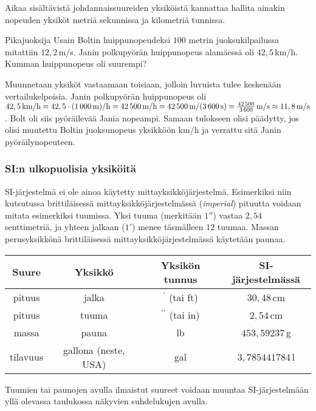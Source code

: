 Aikaa sisältävistä johdannaissuureiden yksiköistä kannattaa hallita ainakin nopeuden yksiköt metriä sekunnissa ja kilometriä tunnissa.

\begin{esimerkki}
Pikajuoksija Usain Boltin huippunopeudeksi $100$ metrin juoksukilpailussa mitattiin $12,2$\,m/s. Janin polkupyörän huippunopeus alamäessä oli $42,5$\,km/h. Kumman huippunopeus oli suurempi?
	\begin{esimratk}
Muunnetaan yksiköt vastaamaan toisiaan, jolloin luvuista tulee keskenään vertailukelpoisia. Janin polkupyörän huippunopeus oli $42,5\,\textrm{km/h} =42,5\cdot \textrm{(1\,000\,m)/h} = 42\,500\,\textrm{m/h} = 42\,500\,\textrm{m/(3\,600\,s)}= \frac{42\,500}{3\,600}\,\textrm{m/s} \approx 11,8\,\textrm{m/s}$. Bolt oli siis pyöräilevää Jania nopeampi. Samaan tulokseen olisi päädytty, jos olisi muutettu Boltin juoksunopeus yksikköön km/h ja verrattu sitä Janin pyöräilynopeuteen.
	\end{esimratk}
\end{esimerkki}


\subsubsection*{SI:n ulkopuolisia yksiköitä}

SI-järjestelmä ei ole ainoa käytetty mittayksikköjärjestelmä. Esimerkiksi niin kutsutussa brittiläisessä mittayksikköjärjestelmässä (\textit{imperial}) pituutta voidaan mitata esimerkiksi tuumissa. Yksi tuuma (merkitään $1''$) vastaa $2,54$ senttimetriä, ja yhteen jalkaan ($1'$) menee täsmälleen $12$ tuumaa. Massan perusyksikkönä brittiläisessä mittayksikköjärjestelmässä käytetään paunaa. %

\begin{tabular}{c|c|c|c}
Suure & Yksikkö & Yksikön tunnus & SI-järjestelmässä\\
\hline
pituus & jalka & $^\prime$ (tai ft) & $30,48$\,cm \\
pituus & tuuma & $^{\prime \prime}$ (tai in) & $2,54$\,cm \\
massa & pauna & lb & $453,59237$\,g \\
tilavuus & gallona (neste, USA) & gal &  $3,785441784$\,l
\end{tabular}

Tuumien tai paunojen avulla ilmaistut suureet voidaan muuntaa SI-järjestelmään yllä olevassa taulukossa näkyvien suhdelukujen avulla.

